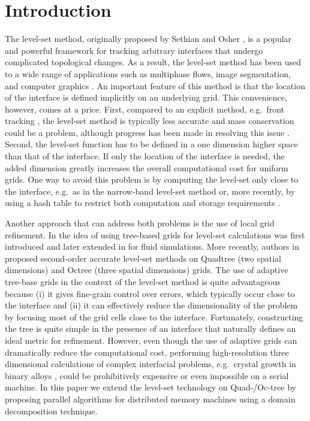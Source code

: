 \section{Introduction}\label{sec:introduction}
The level-set method, originally proposed by Sethian and Osher \cite{Osher;Sethian:88:Fronts-Propagating-w}, is a popular and powerful framework for tracking arbitrary interfaces that undergo complicated topological changes. As a result, the level-set method has been used to a wide range of applications such as multiphase flows, image segmentation, and computer graphics \cite{Osher;Fedkiw:02:Level-Set-Methods-an,Sethian:99:Level-set-methods-an}. An important feature of this method is that the location of the interface is defined implicitly on an underlying grid. This convenience, however, comes at a price. First, compared to an explicit method, e.g.\ front tracking \cite{Juric:96:A-Front-Tracking-Met, Tryggvason;Bunner;Esmaeeli;etal:01:A-Front-Tracking-Met}, the level-set method is typically less accurate and mass conservation could be a problem, although progress has been made in resolving this issue \cite{Enright;Fedkiw;Ferziger;etal:02:A-Hybrid-Particle-Le}. Second, the level-set function has to be defined in a one dimension higher space than that of the interface. If only the location of the interface is needed, the added dimension greatly increases the overall computational cost for uniform grids. One way to avoid this problem is by computing the level-set only close to the interface, e.g.\ as in the narrow-band level-set method \cite{Adalsteinsson;Sethian:95:A-Fast-Level-Set-Met} or, more recently, by using a hash table to restrict both computation and storage requirements \cite{Brun;Guittet;Gibou:12:A-local-level-set-me}.

Another approach that can address both problems is the use of local grid refinement. In \cite{Strain:99:Tree-Methods-for-Mov} the idea of using tree-based grids for level-set calculations was first introduced and later extended in \cite{Popinet:03:Gerris:-A-Tree-Based, Losasso;Gibou;Fedkiw:04:Simulating-Water-and} for fluid simulations. More recently, authors in \cite{Min;Gibou:07:A-second-order-accur} proposed second-order accurate level-set methods on Quadtree (two spatial dimensions) and Octree (three spatial dimensions) grids. The use of adaptive tree-base grids in the context of the level-set method is quite advantageous because (i) it gives fine-grain control over errors, which typically occur close to the interface and (ii) it can effectively reduce the dimensionality of the problem by focusing most of the grid cells close to the interface. Fortunately, constructing the tree is quite simple in the presence of an interface that naturally defines an ideal metric for refinement. However, even though the use of adaptive grids can dramatically reduce the computational cost, performing high-resolution three dimensional calculations of complex interfacial problems, e.g.\ crystal growth in binary alloys \cite{Theillard;Gibou;Pollock:14:A-Sharp-Computationa}, could be prohibitively expensive or even impossible on a serial machine. In this paper we extend the level-set technology on Quad-/Oc-tree by proposing parallel algorithms for distributed memory machines using a domain decomposition technique.

